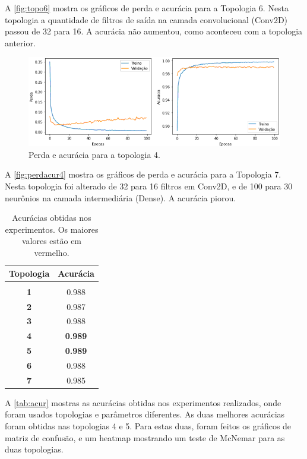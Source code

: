 \documentclass[sigconf, nonacm, screen]{acmart}
\newcommand{\red}[1]{\textbf{\color{ACMRed}#1}}
\begin{document}
A \autoref{fig:topo6} mostra os gráficos de perda e acurácia para a Topologia 6. Nesta topologia a quantidade de filtros de saída na camada convolucional (Conv2D) passou de 32 para 16. A acurácia não aumentou, como aconteceu com a topologia anterior.

\begin{figure}[ht]
	\centering
	\includegraphics[width=\linewidth]{img/perd_acur_4}
	\caption{Perda e acurácia para a topologia 4.}
	\label{fig:topo4}
\end{figure}

A \autoref{fig:perdacur4} mostra os gráficos de perda e acurácia para a Topologia 7. Nesta topologia foi alterado de 32 para 16 filtros em Conv2D, e de 100 para 30 neurônios na camada intermediária (Dense). A acurácia piorou.

\begin{table}
\small
\caption{Acurácias obtidas nos experimentos. Os maiores valores estão em vermelho.}
\label{tab:acur}
\begin{tabular}{cc}\toprule
\textbf{Topologia}      & \textbf{Acurácia} \\
\hline\vspace{-9pt}     & \\
\textbf{1}              &  0.988 \\
\textbf{2}              &  0.987 \\
\textbf{3}              &  0.988 \\
\textbf{4}              &  \red{0.989} \\
\textbf{5}              &  \red{0.989} \\
\textbf{6}              &  0.988 \\
\textbf{7}              &  0.985 \\
\bottomrule
\end{tabular}
\end{table}

A \autoref{tab:acur} mostras as acurácias obtidas nos experimentos realizados, onde foram usados topologias e parâmetros diferentes. As duas melhores acurácias foram obtidas nas topologias 4 e 5. Para estas duas, foram feitos os gráficos de matriz de confusão, e um heatmap mostrando um teste de McNemar para as duas topologias.
\end{document}
